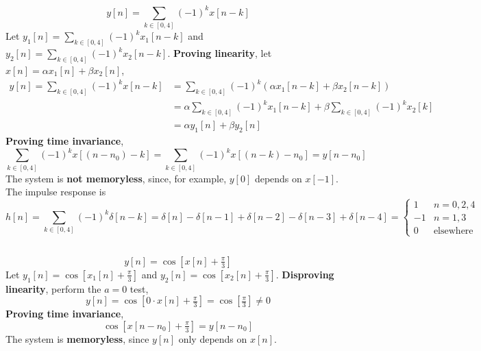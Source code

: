 \documentclass{article}
\begin{document}
\subsection{}

\begin{equation}
    y[n] = \sum_{k \in [0, 4]} (-1)^k x[n - k]
\end{equation}
Let \(y_1[n] = \sum_{k \in [0, 4]} (-1)^k x_1[n - k]\) and \(y_2[n] = \sum_{k \in [0, 4]} (-1)^k x_2[n - k]\).
\textbf{Proving linearity}, let \(x[n] = \alpha x_1[n] + \beta x_2[n]\),
\begin{align}
    y[n] = \sum_{k \in [0, 4]} (-1)^k x[n - k] &= \sum_{k \in [0, 4]} (-1)^k \left(\alpha x_1[n - k] + \beta x_2[n - k]\right) \\
    &= \alpha \sum_{k \in [0, 4]} (-1)^k x_1[n - k] + \beta \sum_{k \in [0, 4]} (-1)^k x_2[k] \\
    &= \alpha y_1[n] + \beta y_2[n]
\end{align}
\textbf{Proving time invariance},
\begin{equation}
    \sum_{k \in [0, 4]} (-1)^k x[(n - n_0) - k] = \sum_{k \in [0, 4]} (-1)^k x[(n - k) - n_0] = y[n - n_0]
\end{equation}
The system is \textbf{not memoryless}, since, for example, \(y[0]\) depends on \(x[-1]\).
The impulse response is
\begin{equation}
    h[n] = \sum_{k \in [0, 4]} (-1)^k \delta [n - k] = \delta[n] - \delta[n - 1] + \delta[n - 2] - \delta[n - 3] + \delta[n - 4] =
    \begin{cases}
        1 & n = 0, 2, 4 \\
        -1 & n = 1, 3 \\
        0 & \text{elsewhere}
    \end{cases}
\end{equation}

\subsection{}

\begin{equation}
    y[n] = \cos[x[n] + \tfrac{\pi}{3}]
\end{equation}
Let \(y_1[n] = \cos[x_1[n] + \tfrac{\pi}{3}]\) and \(y_2[n] = \cos[x_2[n] + \tfrac{\pi}{3}]\).
\textbf{Disproving linearity}, perform the \(a = 0\) test,
\begin{equation}
    y[n] = \cos[0 \cdot x[n] + \tfrac{\pi}{3}] = \cos[\tfrac{\pi}{3}] \neq 0
\end{equation}
\textbf{Proving time invariance},
\begin{equation}
    \cos[x[n - n_0] + \tfrac{\pi}{3}] = y[n - n_0]
\end{equation}
The system is \textbf{memoryless}, since \(y[n]\) only depends on \(x[n]\).
\end{document}
